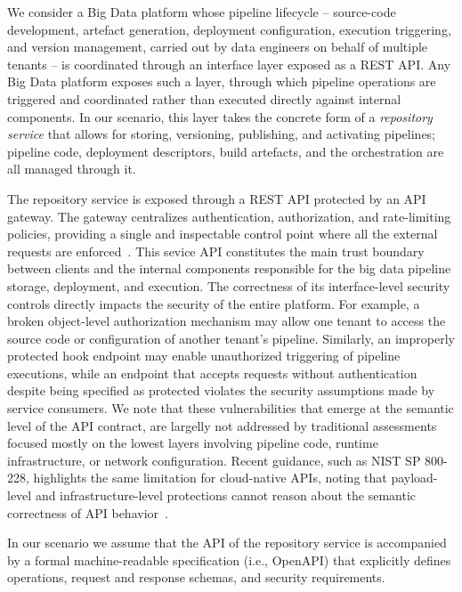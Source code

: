
We consider a Big Data platform whose pipeline lifecycle -- source-code development, artefact generation, deployment configuration, execution triggering, and version management, carried out by data engineers on behalf of multiple tenants -- is coordinated through an interface layer exposed as a REST API. Any Big Data platform exposes such a layer, through which pipeline operations are triggered and coordinated rather than executed directly against internal components. In our scenario, this layer takes the concrete form of a \emph{repository service} that allows for storing, versioning, publishing, and activating pipelines; pipeline code, deployment descriptors, build artefacts, and the orchestration are all managed through it.

The repository service is exposed through a REST API protected by an API gateway. The gateway centralizes authentication, authorization, and rate-limiting policies, providing a single and inspectable control point where all the external requests are enforced~\cite{roseZeroTrustArchitecture2020}. This sevice API constitutes the main trust boundary between clients and the internal components responsible for the big data pipeline storage, deployment, and execution. The correctness of its interface-level security controls directly impacts the security of the entire platform. For example, a broken object-level authorization mechanism may allow one tenant to access the source code or configuration of another tenant's pipeline. Similarly, an improperly protected hook endpoint may enable unauthorized triggering of pipeline executions, while an endpoint that accepts requests without authentication despite being specified as protected violates the security assumptions made by service consumers.
We note that these vulnerabilities that emerge at the semantic level of the API contract, are largelly not addressed by traditional assessments focused mostly on the lowest layers involving pipeline code, runtime infrastructure, or network configuration.
Recent guidance, such as NIST SP 800-228, highlights the same limitation for cloud-native APIs, noting that payload-level and infrastructure-level protections cannot reason about the semantic correctness of API behavior~\cite{chandramouliGuidelinesAPIProtection2026}.

In our scenario we assume that the API of the repository service is accompanied by a formal machine-readable specification (i.e., OpenAPI) that explicitly defines operations, request and response schemas, and security requirements.



